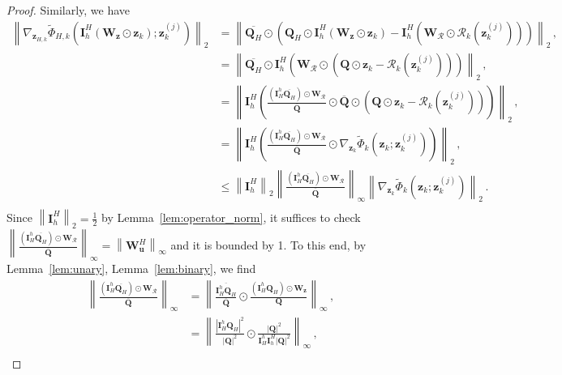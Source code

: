 \documentclass{article}
\numberwithin{equation}{section}
\begin{document}
\begin{proof}
Similarly, we have
\begin{equation*}
    \begin{aligned}
        \left\|\nabla_{\bm{z}_{H,k}}\widetilde{\Phi}_{H,k}\left(\bm{I}_h^H\left(\bm{W}_{\bm{z}}\odot\bm{z}_{k}\right); \bm{z}_k^{(j)}\right)\right\|_2&=\left\|\overline{\bm{Q}_H}\odot\left(\bm{Q}_H\odot\bm{I}_h^H\left(\bm{W}_{\bm{z}}\odot\bm{z}_k\right)- \bm{I}_h^H\left(\bm{W}_{\mathcal{R}}\odot\mathcal{R}_k\left(\bm{z}_k^{(j)}\right)\right)\right) \right\|_2\,,\\
        &=\left\|\overline{\bm{Q}_H}\odot\bm{I}_h^H\left(\bm{W}_{\mathcal{R}}\odot\left(\bm{Q}\odot \bm{z}_k-\mathcal{R}_k\left(\bm{z}_k^{(j)}\right)\right)\right) \right\|_2\,,\\
        &=\left\|\bm{I}_h^H\left(\frac{\left(\bm{I}_H^h\overline{\bm{Q}_H}\right)\odot\bm{W}_{\mathcal{R}}}{\overline{\bm{Q}}}\odot\overline{\bm{Q}}\odot\left(\bm{Q}\odot \bm{z}_k-\mathcal{R}_k\left(\bm{z}_k^{(j)}\right)\right)\right) \right\|_2\,,\\
        &=\left\|\bm{I}_h^H\left(\frac{\left(\bm{I}_H^h\overline{\bm{Q}_H}\right)\odot\bm{W}_{\mathcal{R}}}{\overline{\bm{Q}}}\odot\nabla_{\bm{z}_{k}}\widetilde{\Phi}_k\left(\bm{z}_{k}; \bm{z}_k^{(j)}\right)\right) \right\|_2\,,\\
        &\leq \left\|\bm{I}_h^H\right\|_2\left\|\frac{\left(\bm{I}_H^h\overline{\bm{Q}_H}\right)\odot\bm{W}_{\mathcal{R}}}{\overline{\bm{Q}}}\right\|_{\infty}\left\|\nabla_{\bm{z}_{k}}\widetilde{\Phi}_k\left(\bm{z}_{k}; \bm{z}_k^{(j)}\right) \right\|_2\,.\\
    \end{aligned}
\end{equation*}
Since $\left\|\bm{I}_h^H\right\|_2=\frac{1}{2}$ by Lemma~\ref{lem:operator_norm}, it suffices to check $\left\|\frac{\left(\bm{I}_H^h\overline{\bm{Q}_H}\right)\odot\bm{W}_{\mathcal{R}}}{\overline{\bm{Q}}}\right\|_{\infty} = \left\|\bm{W}_{\bm{u}}^H\right\|_{\infty} $ and it is bounded by 1. To this end, by 
Lemma~\ref{lem:unary}, Lemma~\ref{lem:binary}, we find
\begin{equation*}
    \begin{aligned}
        \left\|\frac{\left(\bm{I}_H^h\overline{\bm{Q}_H}\right)\odot\bm{W}_{\mathcal{R}}}{\overline{\bm{Q}}}\right\|_{\infty}&= \left\|\frac{\overline{\bm{I}_H^h\bm{Q}_H}}{\overline{\bm{Q}}}\odot\frac{(\bm{I}_H^h\bm{Q}_H)\odot\bm{W}_{\bm{z}}}{\bm{Q}}\right\|_{\infty}\,,\\
        &= \left\|\frac{|\bm{I}_H^h\bm{Q}_H|^2}{|\bm{Q}|^2}\odot\frac{|\bm{Q}|^2}{\bm{I}_H^h\bm{I}_h^H|\bm{Q}|^2}\right\|_{\infty}\,,\\

\end{aligned}
\end{equation*}
\end{proof}
\end{document}
